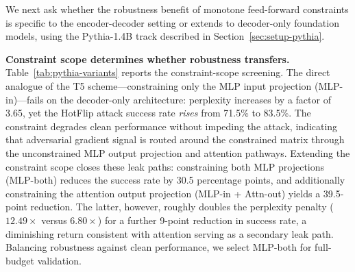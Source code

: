 \documentclass{article}
\theoremstyle{plain}
\theoremstyle{definition}
\theoremstyle{remark}
\begin{document}
We next ask whether the robustness benefit of monotone feed-forward constraints is specific to the encoder-decoder setting or extends to decoder-only foundation models, using the Pythia-1.4B track described in Section~\ref{sec:setup-pythia}.

\textbf{Constraint scope determines whether robustness transfers.}
Table~\ref{tab:pythia-variants} reports the constraint-scope screening. The direct analogue of the T5 scheme—constraining only the MLP input projection (MLP-in)—fails on the decoder-only architecture: perplexity increases by a factor of 3.65, yet the HotFlip attack success rate \emph{rises} from 71.5\% to 83.5\%. The constraint degrades clean performance without impeding the attack, indicating that adversarial gradient signal is routed around the constrained matrix through the unconstrained MLP output projection and attention pathways. Extending the constraint scope closes these leak paths: constraining both MLP projections (MLP-both) reduces the success rate by 30.5 percentage points, and additionally constraining the attention output projection (MLP-in + Attn-out) yields a 39.5-point reduction. The latter, however, roughly doubles the perplexity penalty ($12.49\times$ versus $6.80\times$) for a further 9-point reduction in success rate, a diminishing return consistent with attention serving as a secondary leak path. Balancing robustness against clean performance, we select MLP-both for full-budget validation.

\begin{table}[t]
\caption{Constraint-scope screening on Pythia-1.4B (seed = 42). PPL denotes held-out Pile perplexity; SR denotes HotFlip attack success rate ($n = 200$, 10 flips). MLP-in was screened under the full training budget, the other scopes under a reduced budget.}
\label{tab:pythia-variants}
\vskip 0.1in
\centering
{}
\vskip -0.1in
\end{table}
\end{document}
